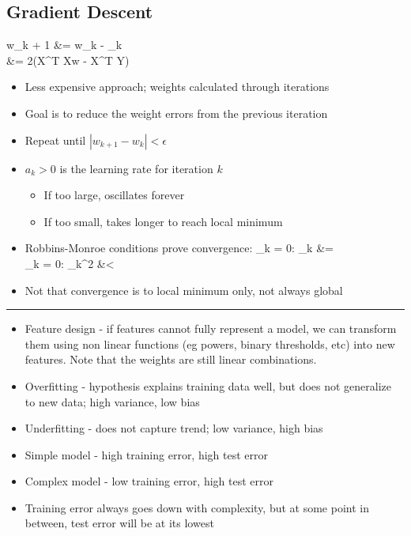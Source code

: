 \documentclass[12pt]{article}
\newcommand{\abs}[1]{\left|#1\right|}
\newcommand{\divider}[0]{\par\textcolor{lightgray}{\rule{\textwidth}{0.1pt}}}
\newenvironment{eqn}{\equation\alignedat{3}}{\endalignedat\endequation}
\begin{document}
\subsection{Gradient Descent}

\begin{eqn}
	w_{k + 1} &= w_k - \alpha_k  \\
	 &= 2(X^T Xw - X^T Y)
\end{eqn}
\begin{itemize}
	\item Less expensive approach; weights calculated through iterations
	\item Goal is to reduce the weight errors from the previous iteration
	\item Repeat until $\abs{w_{k + 1} - w_k} < \epsilon$
	\item $a_k > 0$ is the learning rate for iteration $k$
	\begin{itemize}
		\item If too large, oscillates forever
		\item If too small, takes longer to reach local minimum
	\end{itemize}
	\item Robbins-Monroe conditions prove convergence:
	\begin{eqn}
		\Sigma_{k = 0:\infty} \alpha_k &= \infty  \\
		\Sigma_{k = 0:\infty} \alpha_k^2 &< \infty
	\end{eqn}
	\item Not that convergence is to local minimum only, not always global
\end{itemize}

\divider

\begin{itemize}
	\item Feature design - if features cannot fully represent a model, we can transform them using non linear functions (eg powers, binary thresholds, etc) into new features. Note that the weights are still linear combinations.
	\item Overfitting - hypothesis explains training data well, but does not generalize to new data; high variance, low bias 
	\item Underfitting - does not capture trend; low variance, high bias
	\item Simple model - high training error, high test error 
	\item Complex model - low training error, high test error 
	\item Training error always goes down with complexity, but at some point in between, test error will be at its lowest
\end{itemize}
\end{document}
